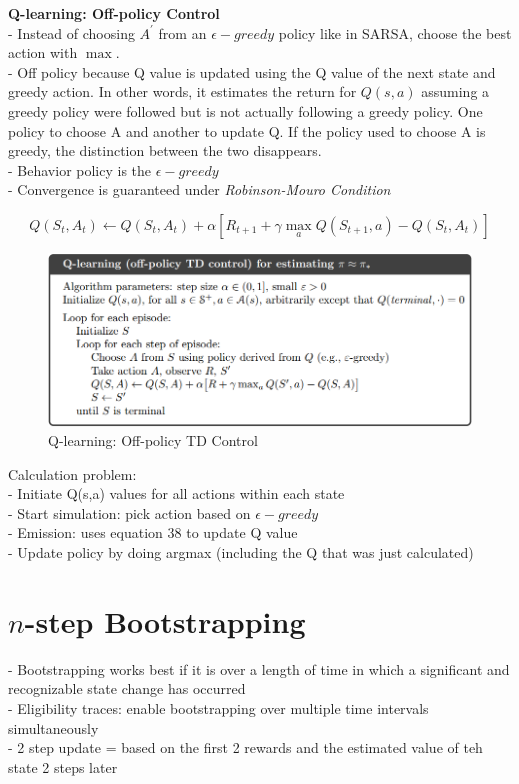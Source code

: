 \documentclass{article}
\begin{document}
\noindent
\textbf{Q-learning: Off-policy Control}\\
- Instead of choosing $A^{\prime}$ from an $\epsilon-greedy$ policy like in
SARSA, choose the best action with $\max$. \\
- Off policy because Q value is updated using the Q value of the next state and
greedy action. In other words, it estimates the return for $Q(s,a)$ assuming a
greedy policy were followed but is not actually following a greedy policy. One
policy to choose A and another to update Q. If the policy used to choose A is
greedy, the distinction between the two disappears.\\
- Behavior policy is the $\epsilon-greedy$\\
- Convergence is guaranteed under \textit{Robinson-Mouro Condition}

\begin{equation}
Q\left(S_{t}, A_{t}\right) \leftarrow Q\left(S_{t}, A_{t}\right)+\alpha\left[R_{t+1}+\gamma \max _{a} Q\left(S_{t+1}, a\right)-Q\left(S_{t}, A_{t}\right)\right]
\end{equation}

\begin{figure}[h]
\includegraphics[scale=0.4]{offpolicy_qlearning}
\centering
\caption{Q-learning: Off-policy TD Control}
\end{figure}

\noindent
Calculation problem:\\
- Initiate Q(s,a) values for all actions within each state\\
- Start simulation: pick action based on $\epsilon-greedy$\\
- Emission: uses equation 38 to update Q value\\
- Update policy by doing argmax (including the Q that was just calculated)

\newpage
\noindent
\section{$n$-step Bootstrapping}
- Bootstrapping works best if it is over a length of time in which a significant
and recognizable state change has occurred \\
- Eligibility traces: enable bootstrapping over multiple time intervals
simultaneously \\
- 2 step update = based on the first 2 rewards and the estimated value of teh
state 2 steps later\\
\end{document}
